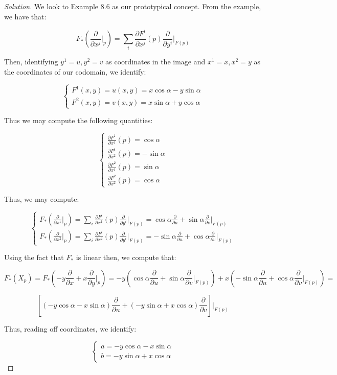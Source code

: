 \documentclass[10pt]{article}
\begin{document}
\begin{proof}[Solution]

We look to Example 8.6 as our prototypical concept. From the example, we have that:

$$ F_*\left( \frac{\partial}{\partial x^j} \bigg|_p \right) = \sum_{i} \frac{\partial F^i}{ \partial x^j}(p) \frac{\partial}{\partial y^i} \bigg|_{F(p)} $$

Then, identifying $y^1 = u, y^2 = v$ as coordinates in the image and $x^1 = x, x^2 = y$ as the coordinates of our codomain, we identify:

$$ \begin{cases} F^1(x,y) = u(x,y) = x \cos \alpha - y \sin \alpha \\ F^2(x,y) = v(x,y) = x \sin \alpha + y \cos \alpha \end{cases}$$

Thus we may compute the following quantities:

$$ \begin{cases} \frac{\partial F^1}{ \partial x^1}(p) = \cos \alpha \\ \frac{\partial F^1}{ \partial x^2}(p) = - \sin \alpha \\ \frac{\partial F^2}{ \partial x^1}(p) = \sin \alpha \\ \frac{\partial F^2}{ \partial x^2}(p) = \cos \alpha \end{cases} $$

Thus, we may compute:

$$\begin{cases}  F_*\left( \frac{\partial}{\partial x^1} \bigg|_p \right) = \sum_{i} \frac{\partial F^i}{ \partial x^1}(p) \frac{\partial}{\partial y^i} \bigg|_{F(p)} = \cos \alpha \frac{\partial}{\partial u}  + \sin \alpha \frac{\partial}{\partial v}  \bigg|_{F(p)} \\  F_*\left( \frac{\partial}{\partial x^2} \bigg|_p \right) = \sum_{i} \frac{\partial F^i}{ \partial x^2}(p) \frac{\partial}{\partial y^i} \bigg|_{F(p)} = -\sin \alpha \frac{\partial}{\partial u}  + \cos \alpha \frac{\partial}{\partial v}  \bigg|_{F(p)} \end{cases}$$

Using the fact that $F_*$ is linear then, we compute that:

$$ F_*(X_p) = F_*\left(  -y \frac{\partial}{\partial x}+ x \frac{\partial}{\partial y} \bigg|_p\right) = -y \left(  \cos \alpha \frac{\partial}{\partial u}  + \sin \alpha \frac{\partial}{\partial v}  \bigg|_{F(p)} \right) + x \left(-\sin \alpha \frac{\partial}{\partial u}  + \cos \alpha \frac{\partial}{\partial v}  \bigg|_{F(p)} \right)= $$

$$ \left[ (-y \cos\alpha - x \sin \alpha)  \frac{\partial}{\partial u}  + (-y \sin \alpha + x \cos \alpha)  \frac{\partial}{\partial v} \right]  \bigg|_{F(p)}$$

Thus, reading off coordinates, we identify:

$$\begin{cases} a = -y \cos\alpha - x \sin \alpha \\ b = -y \sin \alpha + x \cos \alpha \end{cases} $$
  

\end{proof}
\end{document}
